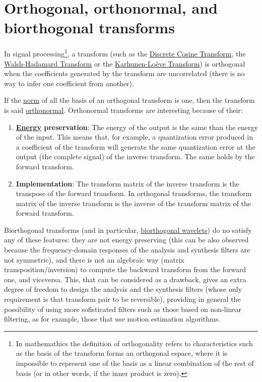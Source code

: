 \section{Orthogonal, orthonormal, and biorthogonal transforms}

In signal processing\footnote{In mathemathics the definition of
  orthogonality refers to characteristics such as the basis of the
  transform forms an orthogonal espace, where it is impossible to
  represent one of the basis as a linear combination of the rest of
  basis (or in other words, if the inner product is zero).}, a
transform (such as the
\href{https://en.wikipedia.org/wiki/Discrete_cosine_transform}{Discrete
  Cosine Transform}, the
\href{https://en.wikipedia.org/wiki/Hadamard_transform}{Walsh-Hadamard
  Transform} or the
\href{https://en.wikipedia.org/wiki/Karhunen%E2%80%93Lo%C3%A8ve_theorem}{Karhunen-Loève
  Transform}) is orthogonal when the coefficients generated by the
transform are uncorrelated (there is no way to infer one coefficient
from another).

If the \href{https://en.wikipedia.org/wiki/Norm_(mathematics)}{norm}
of all the basis of an orthogonal transform is one, then the transform
is said
\href{https://en.wikipedia.org/wiki/Orthonormal_basis}{orthonormal}. Orthonormal
transforms are interesting because of their:
\begin{enumerate}
\item
  \textbf{\href{https://en.wikipedia.org/wiki/Energy_(signal_processing)}{Energy}
    preservation}: The energy of the output is the same than the
  energy of the input. This means that, for example, a quantization
  error produced in a coefficient of the transform will generate the
  same quantization error at the output (the complete signal) of the
  inverse transform. The same holds by the forward transform.
\item \textbf{Implementation}: The transform matrix of the
  inverse transform is the transpose of the forward transform. In
  orthogonal transforms, the transform matrix of the inverse transform
  is the inverse of the transform matrix of the forward transform.
\end{enumerate}

Biorthogonal transforms (and in particular,
\href{https://en.wikipedia.org/wiki/Biorthogonal_wavelet}{biorthogonal
  wavelets}) do no satisfy any of these features: they are not energy
preserving (this can be also observed because the frequency-domain
responses of the analysis and synthesis filters are not symmetric),
and there is not an algebraic way (matrix transposition/inversion) to
compute the backward transform from the forward one, and
viceversa. This, that can be considered as a drawback, gives an extra
degree of freedom to design the analysis and the synthesis filters
(whose only requirement is that transform pair to be reversible),
providing in general the possibility of using more sofisticated
filters such as those based on non-linear filtering, as for example,
those that use motion estimation algorithms.

